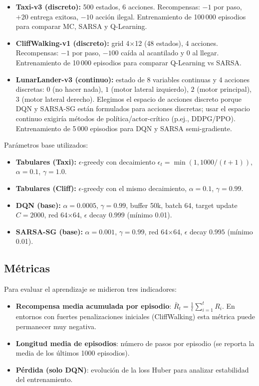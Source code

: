\begin{itemize}
    \item \textbf{Taxi-v3 (discreto):} 500 estados, 6 acciones. Recompensas: $-1$ por paso, $+20$ entrega exitosa, $-10$ acción ilegal. Entrenamiento de 100\,000 episodios para comparar MC, SARSA y Q-Learning.
    \item \textbf{CliffWalking-v1 (discreto):} grid 4$\times$12 (48 estados), 4 acciones. Recompensas: $-1$ por paso, $-100$ caída al acantilado y $0$ al llegar. Entrenamiento de 10\,000 episodios para comparar Q-Learning vs SARSA.
    \item \textbf{LunarLander-v3 (continuo):} estado de 8 variables continuas y 4 acciones discretas: $0$ (no hacer nada), $1$ (motor lateral izquierdo), $2$ (motor principal), $3$ (motor lateral derecho). Elegimos el espacio de acciones discreto porque DQN y SARSA-SG están formulados para acciones discretas; usar el espacio continuo exigiría métodos de política/actor-crítico (p.ej., DDPG/PPO). Entrenamiento de 5\,000 episodios para DQN y SARSA semi-gradiente.
\end{itemize}

Parámetros base utilizados:

\begin{itemize}
    \item \textbf{Tabulares (Taxi):} $\epsilon$-greedy con decaimiento $\epsilon_t=\min(1,1000/(t+1))$, $\alpha=0.1$, $\gamma=1.0$.
    \item \textbf{Tabulares (Cliff):} $\epsilon$-greedy con el mismo decaimiento, $\alpha=0.1$, $\gamma=0.99$.
    \item \textbf{DQN (base):} $\alpha=0.0005$, $\gamma=0.99$, buffer 50k, batch 64, target update $C=2000$, red 64$\times$64, $\epsilon$ decay $0.999$ (mínimo 0.01).
    \item \textbf{SARSA-SG (base):} $\alpha=0.001$, $\gamma=0.99$, red 64$\times$64, $\epsilon$ decay $0.995$ (mínimo 0.01).
\end{itemize}

\subsection{Métricas}

Para evaluar el aprendizaje se midieron tres indicadores:
\begin{itemize}
    \item \textbf{Recompensa media acumulada por episodio}: $\bar{R}_t = \frac{1}{t}\sum_{i=1}^{t} R_i$. En entornos con fuertes penalizaciones iniciales (CliffWalking) esta métrica puede permanecer muy negativa.
    \item \textbf{Longitud media de episodios}: número de pasos por episodio (se reporta la media de los últimos 1000 episodios).
    \item \textbf{Pérdida (solo DQN)}: evolución de la loss Huber para analizar estabilidad del entrenamiento.
\end{itemize}

